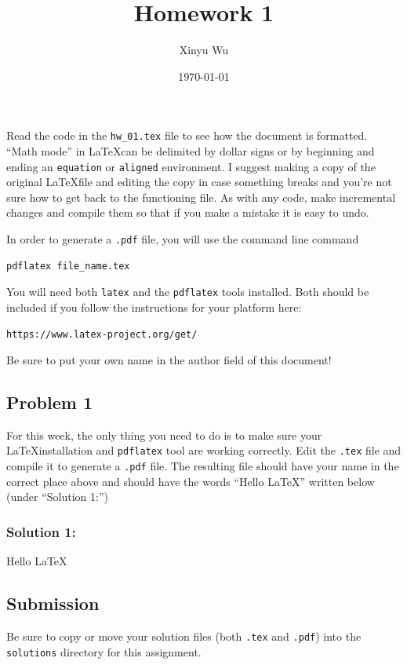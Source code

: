 \documentclass{article}
\title{Homework 1}
\author{Xinyu Wu}
\date\today
\begin{document}
\maketitle %

Read the code in the \texttt{hw\_01.tex} file to see how the document is formatted. ``Math mode'' in \LaTeX  can be delimited by dollar signs or by beginning and ending an \texttt{equation} or \texttt{aligned} environment. I suggest making a copy of the original \LaTeX file and editing the copy in case something breaks and you're not sure how to get back to the functioning file. As with any code, make incremental changes and compile them so that if you make a mistake it is easy to undo.

In order to generate a \texttt{.pdf} file, you will use the command line command

\begin{verbatim}
pdflatex file_name.tex
\end{verbatim}

You will need both \texttt{latex} and the \texttt{pdflatex} tools installed. Both should be included if you follow the instructions for your platform here:

\begin{verbatim}
https://www.latex-project.org/get/
\end{verbatim}

Be sure to put your own name in the author field of this document!

\subsection*{Problem 1}

For this week, the only thing you need to do is to make sure your \LaTeX installation and \texttt{pdflatex} tool are working correctly. Edit the \texttt{.tex} file and compile it to generate a \texttt{.pdf} file. The resulting file should have your name in the correct place above and should have the words ``Hello \LaTeX'' written below (under ``Solution 1:'')

\subsubsection*{Solution 1:}

Hello \LaTeX


\subsection*{Submission}

Be sure to copy or move your solution files (both \texttt{.tex} and \texttt{.pdf}) into the \texttt{solutions} directory for this assignment.
\end{document}
